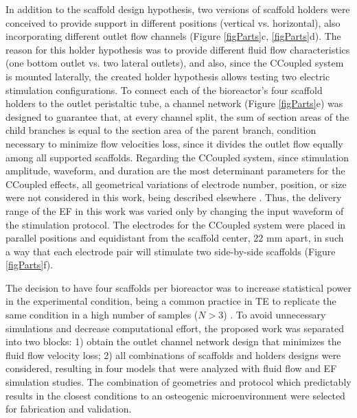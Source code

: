 In addition to the scaffold design hypothesis, two versions of scaffold holders were conceived to provide support in different positions (vertical vs. horizontal), also incorporating different outlet flow channels (Figure \ref{figParts}c, \ref{figParts}d). The reason for this holder hypothesis was to provide different fluid flow characteristics (one bottom outlet vs. two lateral outlets), and also, since the CCoupled system is mounted laterally, the created holder hypothesis allows testing two electric stimulation configurations. To connect each of the bioreactor's four scaffold holders to the outlet peristaltic tube, a channel network (Figure \ref{figParts}e) was designed to guarantee that, at every channel split, the sum of section areas of the child branches is equal to the section area of the parent branch, condition necessary to minimize flow velocities loss, since it divides the outlet flow equally among all supported scaffolds. Regarding the \ac{CCoupled} system, since stimulation amplitude, waveform, and duration are the most determinant parameters for the \ac{CCoupled} effects, all geometrical variations of electrode number, position, or size were not considered in this work, being described elsewhere \cite{Tandon2008-jg}. Thus, the delivery range of the \acs{EF} in this work was varied only by changing the input waveform of the stimulation protocol. The electrodes for the \ac{CCoupled} system were placed in parallel positions and equidistant from the scaffold center, 22 \si{\milli\meter} apart, in such a way that each electrode pair will stimulate two side-by-side scaffolds (Figure \ref{figParts}f). 

The decision to have four scaffolds per bioreactor was to increase statistical power in the experimental condition, being a common practice in \acs{TE} to replicate the same condition in a high number of samples ($N>3$) \cite{Pollard2019-tz, Silva2020-dc}. To avoid unnecessary simulations and decrease computational effort, the proposed work was separated into two blocks: 1) obtain the outlet channel network design that minimizes the fluid flow velocity loss; 2) all combinations of scaffolds and holders designs were considered, resulting in four models that were analyzed with fluid flow and \acs{EF} simulation studies. The combination of geometries and protocol which predictably results in the closest conditions to an osteogenic microenvironment were selected for fabrication and validation.


